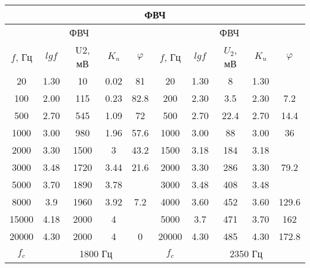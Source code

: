 \documentclass[a4paper,14pt]{extreport}
\begin{document}
\begin{table}[h!]%
	\begin{center}
		\begin{small}
			\begin{tabular}{|c|c|c|c|c|c|c|c|c|c|}
			\hline
			\multicolumn{10}{|c|}{ФВЧ}                                                      \\ \hline
			\multicolumn{5}{|c|}{ФВЧ}              & \multicolumn{5}{c|}{ФВЧ}               \\ \hline
			$f$, Гц & $lg f$ & U2, мВ & $K_u$ & $\varphi$    & $f$, Гц & $lg f$ & $U_2$, мВ & $K_u $  & $\varphi$     \\ \hline
			20      & 1.30 & 10     & 0.02  & 81   & 20      & 1.30 & 8      & 1.30 &       \\ \hline
			100     & 2.00 & 115    & 0.23  & 82.8 & 200     & 2.30 & 3.5    & 2.30 & 7.2   \\ \hline
			500     & 2.70 & 545    & 1.09  & 72   & 500     & 2.70 & 22.4   & 2.70 & 14.4  \\ \hline
			1000    & 3.00 & 980    & 1.96  & 57.6 & 1000    & 3.00 & 88     & 3.00 & 36    \\ \hline
			2000    & 3.30 & 1500   & 3     & 43.2 & 1500    & 3.18 & 184    & 3.18 &       \\ \hline
			3000    & 3.48 & 1720   & 3.44  & 21.6 & 2000    & 3.30 & 286    & 3.30 & 79.2  \\ \hline
			5000    & 3.70 & 1890   & 3.78  &      & 3000    & 3.48 & 408    & 3.48 &       \\ \hline
			8000    & 3.9  & 1960   & 3.92  & 7.2  & 4000    & 3.60 & 452    & 3.60 & 129.6 \\ \hline
			15000   & 4.18 & 2000   & 4     &      & 5000    & 3.7  & 471    & 3.70 & 162   \\ \hline
			20000   & 4.30 & 2000   & 4     & 0    & 20000   & 4.30 & 485    & 4.30 & 172.8 \\ \hline
			$f_c $     & \multicolumn{4}{c|}{1800 Гц} & $f_c$      & \multicolumn{4}{c|}{2350 Гц} \\ \hline
			\end{tabular}
		\end{small}
	\end{center}
\end{table}
\end{document}
